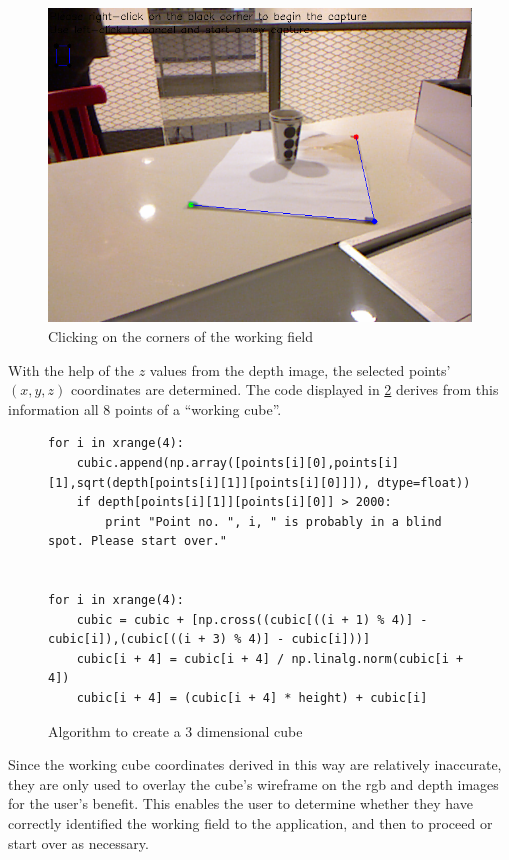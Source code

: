 \begin{figure}[H]
\centering
\includegraphics[scale=0.5]{images/clicking.png}
\caption{Clicking on the corners of the working field}
\label{fig:clicking}
\end{figure}

With the help of the $z$ values from the depth image, the selected points'
$(x,y,z)$ coordinates are determined. The code displayed in \ref{code:cube}
derives from this information all 8 points of a ``working cube''.\\

\begin{figure}[H]
\begin{lstlisting}
for i in xrange(4):
    cubic.append(np.array([points[i][0],points[i][1],sqrt(depth[points[i][1]][points[i][0]]]), dtype=float))
    if depth[points[i][1]][points[i][0]] > 2000:
        print "Point no. ", i, " is probably in a blind spot. Please start over."


for i in xrange(4):
    cubic = cubic + [np.cross((cubic[((i + 1) % 4)] - cubic[i]),(cubic[((i + 3) % 4)] - cubic[i]))]
    cubic[i + 4] = cubic[i + 4] / np.linalg.norm(cubic[i + 4])
    cubic[i + 4] = (cubic[i + 4] * height) + cubic[i]
\end{lstlisting}
\caption{Algorithm to create a 3 dimensional cube}
\label{code:cube}
\end{figure}

Since the working cube coordinates derived in this way are relatively
inaccurate, they are only used to overlay the cube's wireframe on the rgb and
depth images for the user's benefit. This enables the user to determine whether
they have correctly identified the working field to the application, and then to
proceed or start over as necessary.

